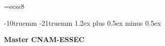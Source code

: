 \makeatletter
\def\cleardoublepage{\clearpage\if@twoside \ifodd\c@page\else
\hbox{}
\thispagestyle{plain}
\newpage
\if@twocolumn\hbox{}\newpage\fi\fi\fi}
\makeatother

\font\mysf=ecss8


\setlength{\textwidth}{150truemm}
\setlength{\textheight}{230truemm}
\setlength{\topmargin}{10truemm}
\hoffset -10truemm    %
\voffset -21truemm    %
\parindent 4mm
\parskip 1.2ex plus 0.5ex minus 0.5ex
\makeatletter
\def\section{\@startsection {section}{1}{\z@}{-3.5ex plus -1ex minus
    -.2ex}{2.3ex plus .2ex}{\large\bf}}
\makeatother
\pagestyle{myheadings}
{\centerline{\textbf{Master CNAM-ESSEC}}}

 
